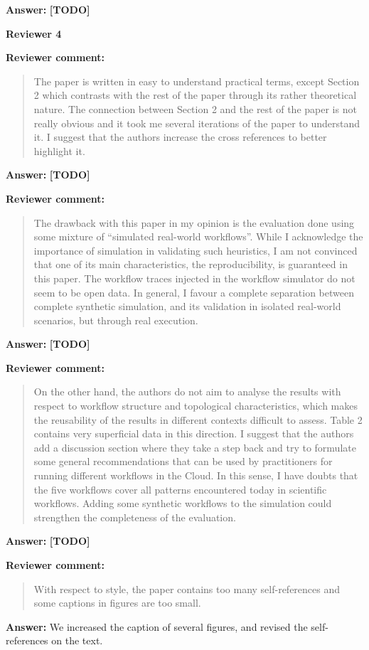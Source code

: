 \documentclass{letter}
\newenvironment{review}%
{\textbf{Reviewer comment:}\begin{quote}}%
{\end{quote}}%
\newcommand{\todo}[1]{%
      \color{red}\textbf{[TODO]} #1\color{black}}
\newcommand{\answer}[1]{%
      \textbf{Answer:} #1}
\begin{document}
\begin{letter}{}
\answer{\todo{}}



\newpage

%
%
\textbf{Reviewer 4}

\begin{review}
The paper is written in easy to understand practical terms, except Section 2 which contrasts with the rest of the paper through its rather theoretical nature. The connection between Section 2 and the rest of the paper is not really obvious and it took me several iterations of the paper to understand it. I suggest that the authors increase the cross references to better highlight it. 
\end{review}

\answer{\todo{}}



\begin{review}
The drawback with this paper in my opinion is the evaluation done using some mixture of ``simulated real-world workflows''. While I acknowledge the importance of simulation in validating such heuristics, I am not convinced that one of its main characteristics, the reproducibility, is guaranteed in this paper. The workflow traces injected in the workflow simulator do not seem to be open data. In general, I favour a complete separation between complete synthetic simulation, and its validation in isolated real-world scenarios, but through real execution. 
\end{review}

\answer{\todo{}}



\begin{review}
On the other hand, the authors do not aim to analyse the results with respect to workflow structure and topological characteristics, which makes the reusability of the results in different contexts difficult to assess. Table 2 contains very superficial data in this direction. I suggest that the authors add a discussion section where they take a step back and try to formulate some general recommendations that can be used by practitioners for running different workflows in the Cloud. In this sense, I have doubts that the five workflows cover all patterns encountered today in scientific workflows. Adding some synthetic workflows to the simulation could strengthen the completeness of the evaluation.
\end{review}

\answer{\todo{}}



\begin{review}
With respect to style, the paper contains too many self-references and some captions in figures are too small.
\end{review}

\answer{We increased the caption of several figures, and revised the self-references on the text.}



\end{letter}
\end{document}
